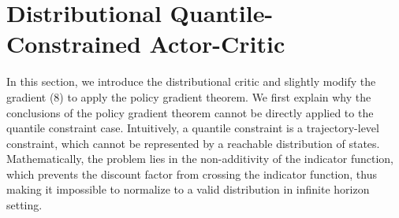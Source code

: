 \section{Distributional Quantile-Constrained Actor-Critic}
In this section, we introduce the distributional critic and slightly modify the gradient (8) to apply the policy gradient theorem. We first explain why the conclusions of the policy gradient theorem cannot be directly applied to the quantile constraint case. Intuitively, a quantile constraint is a trajectory-level constraint, which cannot be represented by a reachable distribution of states. Mathematically, the problem lies in the non-additivity of the indicator function, which prevents the discount factor from crossing the indicator function, thus making it impossible to normalize to a valid distribution in infinite horizon setting.

